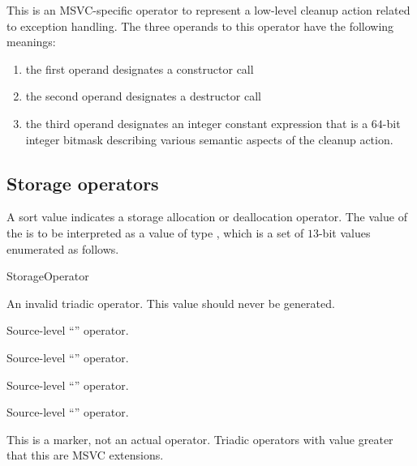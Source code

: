 This is an MSVC-specific operator to represent a low-level cleanup action related to exception handling.
The three operands to this operator have the following meanings:
\begin{enumerate}
  \item the first operand designates a constructor call
  \item the second operand designates a destructor call
  \item the third operand designates an integer constant expression that is
   a $64$-bit integer bitmask describing various semantic aspects of the cleanup action. 
\end{enumerate}


\subsection{Storage operators}
\label{sec:ifc:OperatorSort:Storage}

A sort value  indicates a storage 
allocation or deallocation operator.  The
value of the  is to be interpreted as a value of type 
, which is a set of $13$-bit values enumerated as follows.
%
\begin{Enumeration}{StorageOperator}

	\setcounter{enumi}{2013}
\end{Enumeration}

An invalid triadic operator.  This value should never be generated.

Source-level ``'' operator.

Source-level ``'' operator.

Source-level ``'' operator.

Source-level ``'' operator.

This is a marker, not an actual operator. Triadic operators with 
value greater that this are MSVC extensions.

